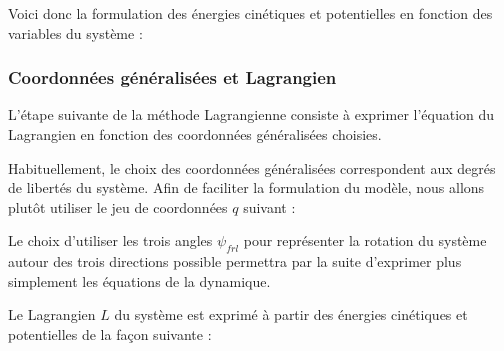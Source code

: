 				
					Voici donc la formulation des énergies cinétiques et potentielles en fonction des variables du système :
					
					
			
			\subsubsection{Coordonnées généralisées et Lagrangien}
			
				L'étape suivante de la méthode Lagrangienne consiste à exprimer l'équation du Lagrangien en fonction des coordonnées généralisées choisies.
				
				Habituellement, le choix des coordonnées généralisées correspondent aux degrés de libertés du système. 
				Afin de faciliter la formulation du modèle, nous allons plutôt utiliser le jeu de coordonnées $q$ suivant :
				
				Le choix d'utiliser les trois angles $\psi_{frl}$ pour représenter la rotation du système autour des trois directions possible permettra par la suite d'exprimer plus simplement les équations de la dynamique.
				
				Le Lagrangien $L$ du système est exprimé à partir des énergies cinétiques et potentielles de la façon suivante :
				
